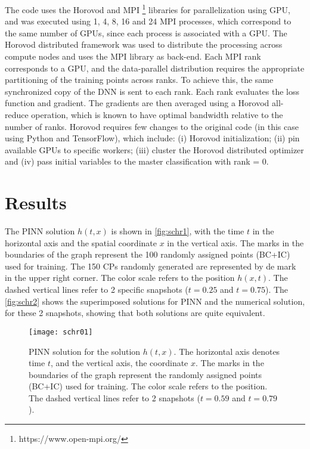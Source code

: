 \documentclass[conference]{IEEEtran}
\begin{document}
The code uses the Horovod and MPI%
\footnote{https://www.open-mpi.org/}
libraries for parallelization using GPU, and was executed using 1, 4, 8, 16 and 24 MPI processes, which correspond to the same number of GPUs, since each process is associated with a GPU. The Horovod distributed framework was used to distribute the processing across compute nodes and uses the MPI library as back-end. Each MPI rank corresponds to a GPU, and the data-parallel distribution requires the appropriate partitioning of the training points across ranks. To achieve this, the same synchronized copy of the DNN is sent to each rank. Each rank evaluates the loss function and gradient. The gradients are then averaged using a Horovod all-reduce operation, which is known to have optimal bandwidth relative to the number of ranks. Horovod requires few changes to the original code (in this case using Python and TensorFlow), which include: (i) Horovod initialization; (ii) pin available GPUs to specific workers; (iii) cluster the Horovod distributed optimizer and (iv) pass initial variables to the master classification with rank = 0.

%
\section{Results}\label{sec:resu}

The PINN solution $h(t,x)$ is shown in \autoref{fig:schr1}, with the time $t$ in the horizontal axis and the spatial coordinate $x$ in the vertical axis. The marks in the boundaries of the graph represent the 100 randomly assigned points (BC+IC) used for training. The 150 CPs randomly generated are represented by de mark in the upper right corner. The color scale refers to the position $h(x,t)$. The dashed vertical lines refer to 2 specific snapshots ($t=0.25$ and $t=0.75$). The \autoref {fig:schr2} shows the superimposed solutions for PINN and the numerical solution, for these 2 snapshots, showing that both solutions are quite equivalent.

\begin{figure}[htb]
\centering
\texttt{[image: schr01]}
\caption{PINN solution for the solution $h(t,x)$. The horizontal axis denotes time $t$, and the vertical axis, the coordinate $x$. The marks in the boundaries of the graph represent the randomly assigned points (BC+IC) used for training. The color scale refers to the position. The dashed vertical lines refer to 2 snapshots ($t=0.59$ and $t=0.79$).} 
\label{fig:schr1}
\end{figure}
\end{document}
